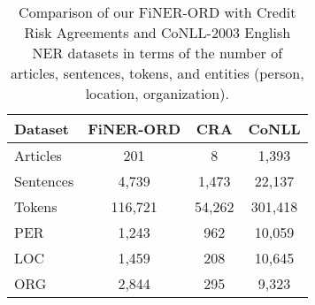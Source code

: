 \documentclass[11pt]{article}
\begin{document}

\begin{table}
\centering
\footnotesize
\begin{tabular}{lccc}
\hline
\textbf{Dataset} & \textbf{FiNER-ORD} & \textbf{CRA} & \textbf{CoNLL}\\
\hline
Articles & 201 & 8 & 1,393\\
Sentences & 4,739 & 1,473 & 22,137\\
Tokens & 116,721 & 54,262 & 301,418\\
PER & 1,243 & 962 & 10,059\\
LOC & 1,459 & 208 & 10,645\\
ORG & 2,844 & 295 & 9,323\\
\hline
\end{tabular}
\caption{Comparison of our FiNER-ORD with Credit Risk Agreements and CoNLL-2003 English NER datasets in terms of the number of articles, sentences, tokens, and entities (person, location, organization).}
\label{tb:dataset_comparison}
\end{table}

\end{document}
